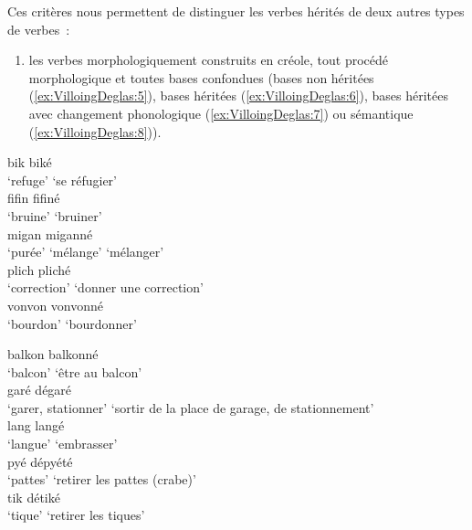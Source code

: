 \documentclass[output=paper]{langsci/langscibook}
\begin{document}
Ces critères nous permettent de distinguer les verbes hérités de deux
autres types de verbes~:

\begin{enumerate}\def\labelenumi{(\roman{enumi})}

\item
  les verbes morphologiquement construits en créole, tout procédé
  morphologique et toutes bases confondues (bases non héritées (\ref{ex:VilloingDeglas:5}),
  bases héritées (\ref{ex:VilloingDeglas:6}), bases héritées avec changement phonologique (\ref{ex:VilloingDeglas:7}) ou
  sémantique (\ref{ex:VilloingDeglas:8})).
\end{enumerate}



\ea\label{ex:VilloingDeglas:5}
  \ea \gll bik \textrightarrow{~} biké\\
  {`refuge'} {} {`se réfugier'}\\
  \ex \gll fifin \textrightarrow{~} fifiné\\
  {`bruine'} {} {`bruiner'}\\
  \ex \gll migan \textrightarrow{~} miganné\\
  {`purée' `mélange'} {} {`mélanger'}\\
  \ex \gll plich \textrightarrow{~} pliché\\
  {`correction'} {} {`donner une correction'}\\
  \ex \gll vonvon \textrightarrow{~} vonvonné\\
  {`bourdon'} {} {`bourdonner'}\\
  \z

\ex\label{ex:VilloingDeglas:6}

  \ea \gll balkon \textrightarrow{~} balkonné\\
  {`balcon'} {} {`être au balcon'}\\
  \ex \gll garé \textrightarrow{~} dégaré\\
  {`garer, stationner'} {} {`sortir de la place de garage, de stationnement'}\\
  \ex \gll lang \textrightarrow{~} langé\\
  {`langue'} {} {`embrasser'}\\
  \ex \gll pyé \textrightarrow{~} dépyété\\
  {`pattes'} {} {`retirer les pattes (crabe)'}\\
  \ex \gll tik \textrightarrow{~} détiké\\
  {`tique'} {} {`retirer les tiques'}\\
  \z
\end{document}
